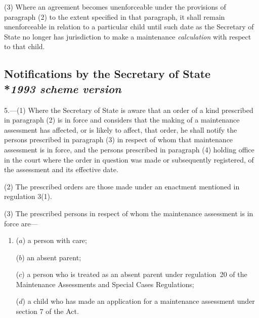 \documentclass[12pt,a4paper]{article}
\begin{document}
(3) Where an agreement becomes unenforceable under the provisions of paragraph (2) to the extent specified in that paragraph, it shall remain unenforceable in relation to a particular child until such date as 
the Secretary of State  %
no longer has jurisdiction to make a maintenance 
\emph{calculation} 
with respect to that child.



\subsection[5. Notifications by the Secretary of State --- \emph{1993 scheme version}]{Notifications by the Secretary of State\\*\emph{1993 scheme version}}

5.—(1) Where 
the Secretary of State  %
is aware that an order of a kind prescribed in paragraph (2) is in force and considers that the making of a maintenance assessment has affected, or is likely to affect, that order, he shall notify the persons prescribed in paragraph (3) in respect of whom that maintenance assessment is in force, and the persons prescribed in paragraph (4) holding office in the court where the order in question was made or subsequently registered, of the assessment and its effective date.

(2) The prescribed orders are those made under an enactment mentioned in regulation 3(1).

(3) The prescribed persons in respect of whom the maintenance assessment is in force are—
\begin{enumerate}\item[]
($a$) a person with care;

($b$) an absent parent;

($c$) a person who is treated as an absent parent under regulation~20 of the Maintenance Assessments and Special Cases Regulations;

($d$) a child who has made an application for a maintenance assessment under section 7 of the Act.
\end{enumerate}
\end{document}
